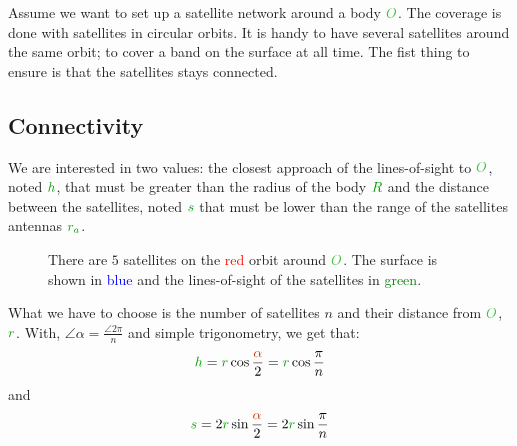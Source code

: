 Assume we want to set up a satellite network around a body
$\posit{O}$. The coverage is done with satellites in circular orbits. It
is handy to have several satellites around the same orbit; to cover a
band on the surface at all time. The fist thing to ensure is that the
satellites stays connected.


\subsection{Connectivity}

We are interested in two values: the closest approach of the
lines-of-sight to $\posit{O}$, noted $\dist{h}$, that must be greater
than the radius of the body $\dist{R}$ and the distance between the
satellites, noted $\dist{s}$ that must be lower than the range of the
satellites antennas $\dist{r_a}$.

\begin{figure}[H]
	\centering
	\def\n{5}
	\caption{
		There are $\n$ satellites on the \textcolor{red}{red}
		orbit around $\posit{O}$. The surface is shown in
		\textcolor{blue}{blue} and the lines-of-sight of the
		satellites in \textcolor{green}{green}.
	}
\end{figure}

What we have to choose is the number of satellites $n$ and their
distance from $\posit{O}$, $\dist{r}$. With, $\angle{\alpha} = \frac
{\angle{2\pi}} n$ and simple trigonometry, we get that:
\[
\dist{h}
= \dist{r} \cos \frac {\angle{\alpha}} 2
= \dist{r} \cos \frac {\pi} n
\]
and
\[
\dist{s}
= 2 \dist{r} \sin \frac {\angle{\alpha}} 2
= 2 \dist{r} \sin \frac {\pi} n
\]

